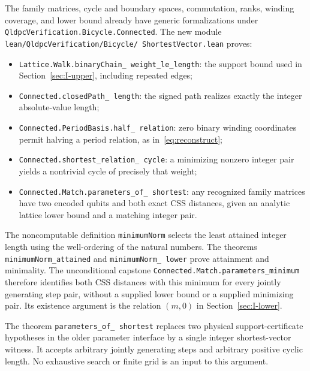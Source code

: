 \documentclass{article}
\numberwithin{equation}{section}
\begin{document}
\begin{sloppypar}
The family matrices, cycle and boundary spaces, commutation, ranks, winding
coverage, and lower bound already have generic formalizations under
\texttt{QldpcVerification.\allowbreak Bicycle.\allowbreak Connected}. The new module
\texttt{lean/\allowbreak QldpcVerification/\allowbreak Bicycle/\allowbreak
ShortestVector.\allowbreak lean} proves:
\begin{itemize}
  \item \texttt{Lattice.\allowbreak Walk.\allowbreak binaryChain\_\allowbreak
  weight\_\allowbreak le\_\allowbreak length}: the support bound used in
    Section~\ref{sec:I-upper}, including repeated edges;
  \item \texttt{Connected.\allowbreak closedPath\_\allowbreak
  length}: the signed path realizes exactly the
    integer absolute-value length;
  \item \texttt{Connected.\allowbreak PeriodBasis.\allowbreak half\_\allowbreak
  relation}: zero binary winding coordinates
    permit halving a period relation, as in~\eqref{eq:reconstruct};
  \item \texttt{Connected.\allowbreak shortest\_\allowbreak relation\_\allowbreak
  cycle}: a minimizing nonzero integer pair
    yields a nontrivial cycle of precisely that weight;
  \item \texttt{Connected.\allowbreak Match.\allowbreak parameters\_\allowbreak of\_\allowbreak
  shortest}: any recognized family
    matrices have two encoded qubits and both exact CSS distances, given an analytic
    lattice lower bound and a matching integer pair.
\end{itemize}

The noncomputable definition \texttt{minimumNorm} selects the least attained integer
length using the well-ordering of the natural numbers. The theorems
\texttt{minimumNorm\_\allowbreak attained} and \texttt{minimumNorm\_\allowbreak
lower} prove attainment and
minimality. The unconditional capstone
\texttt{Connected.\allowbreak Match.\allowbreak parameters\_\allowbreak minimum}
therefore identifies both CSS distances with this minimum for every jointly
generating step pair, without a supplied lower bound or a supplied minimizing
pair. Its existence argument is the relation \((m,0)\) in Section~\ref{sec:I-lower}.

The theorem \texttt{parameters\_\allowbreak of\_\allowbreak
shortest} replaces two physical support-certificate
hypotheses in
the older parameter interface by a single integer shortest-vector witness.
It accepts arbitrary jointly generating steps and arbitrary positive cyclic
length. No exhaustive search or finite grid is an input to this argument.


\end{sloppypar}
\end{document}
